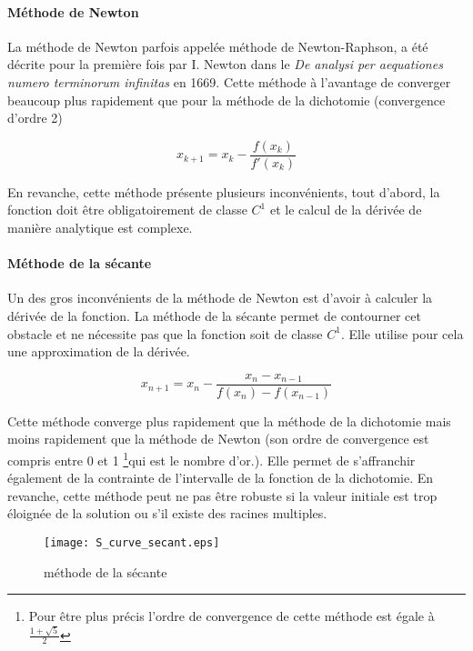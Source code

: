 \paragraph{Méthode de Newton}

La méthode de Newton parfois appelée méthode de Newton-Raphson, a été décrite pour la première fois par I. Newton dans le \textit{De analysi per aequationes numero terminorum infinitas} en 1669. Cette méthode à l'avantage de converger beaucoup plus rapidement que pour la méthode de la dichotomie (convergence d'ordre 2)

\begin{equation}
x_{k+1} = x_k - \frac{f(x_k)}{f'(x_k)}
\end{equation}

En revanche, cette méthode présente plusieurs inconvénients, tout d'abord, la fonction doit être obligatoirement de classe $C^1$ et le calcul de la dérivée de manière analytique est complexe.


\paragraph{Méthode de la sécante}

Un des gros inconvénients de la méthode de Newton est d'avoir à calculer la dérivée de la fonction. La méthode de la sécante permet de contourner cet obstacle et ne nécessite pas que la fonction soit de classe $C^1$. Elle utilise pour cela une approximation de la dérivée.

\begin{equation}
x_{n+1} = x_n - \frac{x_n - x_{n-1}}{f(x_n) - f(x_{n-1})}
\end{equation}

Cette méthode converge plus rapidement que la méthode de la dichotomie mais moins rapidement que la méthode de Newton (son ordre de convergence est compris entre 0 et 1 \footnote{Pour être plus précis l'ordre de convergence de cette méthode est égale à $\frac{1 + \sqrt{5}}{2}$}qui est le nombre d'or.). Elle permet de s'affranchir également de la contrainte de l'intervalle de la fonction de la dichotomie. En revanche, cette méthode peut ne pas être robuste si la valeur initiale est trop éloignée de la solution ou s'il existe des racines multiples.

\begin{figure}[htb!]
	\centering
	\texttt{[image: S\_curve\_secant.eps]}
	\caption{méthode de la sécante}
	\label{Fig::bench}
\end{figure}


